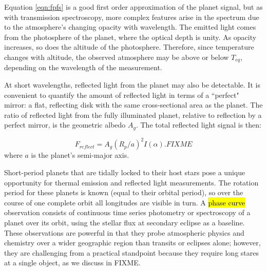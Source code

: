 \documentclass[graybox,natbib,nosecnum]{svmult}
\newcommand{\hbindex}[1]{\hl{#1}\index{#1}}  %
\begin{document}
Equation \ref{eqn:fpfs} is a good first order approximation of the planet signal, but as with transmission spectroscopy, more complex features arise in the spectrum due to the atmosphere's changing opacity with wavelength. The emitted light comes from the photosphere of the planet, where the optical depth is unity.  As opacity increases, so does the altitude of the photosphere.  Therefore, since temperature changes with altitude, the observed atmosphere may be above or below $T_{eq}$, depending on the wavelength of the measurement. 


At short wavelengths, reflected light from the planet may also be detectable. It is convenient to quantify the amount of reflected light in terms of a ``perfect" mirror: a flat, reflecting disk with the same cross-sectional area as the planet. The ratio of reflected light from the fully illuminated planet, relative to reflection by a perfect mirror, is the geometric albedo $A_g$. The total reflected light signal is then:

\begin{equation}
F_{reflect} = A_g(R_p/a)^2 I(\alpha). FIXME
\end{equation}
where $a$ is the planet's semi-major axis.

Short-period planets that are tidally locked to their host stars pose a unique opportunity for thermal emission and reflected light measurements. The rotation period for these planets is known (equal to their orbital period), so over the course of one complete orbit all longitudes are visible in turn. A \hbindex{phase curve} observation consists of continuous time series photometry or spectroscopy of a planet over its orbit, using the stellar flux at secondary eclipse as a baseline. These observations are powerful in that they probe atmospheric physics and chemistry over a wider geographic region than transits or eclipses alone; however, they are challenging from a practical standpoint because they require long stares at a single object, as we discuss in FIXME. %
\end{document}
